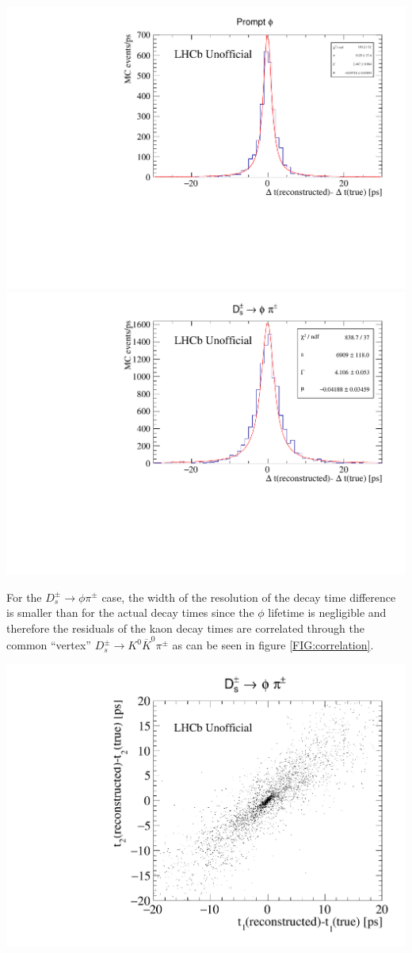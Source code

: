 \begin{center}
\includegraphics[width=.49\textwidth]{figs/time_res_incl/timeResolution-DeltaTauLD.pdf}
\includegraphics[width=.49\textwidth]{figs/time_res_Ds/timeResolution-DeltaTauLD.pdf}
\label{FIG:LD-diff}
\end{center}

For the $D_s^\pm \rightarrow \phi \pi^\pm$ case, the width of the resolution of the decay time difference is smaller than for the actual decay times since the $\phi$ lifetime is negligible and therefore the residuals of the kaon decay times are correlated through the common ``vertex'' $D_s^\pm \rightarrow K^0 \overline{K}^0 \pi^\pm$ as can be seen in figure \ref{FIG:correlation}.

\begin{center}
\includegraphics[width=.7\textwidth]{figs/time_res_Ds/UReco_2D.pdf}
\label{FIG:correlation}
\end{center}



